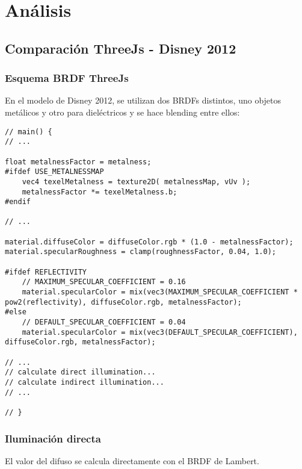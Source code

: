 \chapter{An\'alisis}

\section{Comparaci\'on ThreeJs - Disney 2012}
    \subsection{Esquema BRDF ThreeJs}
        En el modelo de Disney 2012, se utilizan dos BRDFs distintos, uno objetos metálicos y
        otro para dieléctricos y se hace blending entre ellos:
    \singlespacing
    \begin{lstlisting}[caption=My Javascript Example]
// main() {
// ...

float metalnessFactor = metalness;
#ifdef USE_METALNESSMAP
    vec4 texelMetalness = texture2D( metalnessMap, vUv );
    metalnessFactor *= texelMetalness.b;
#endif

// ...

material.diffuseColor = diffuseColor.rgb * (1.0 - metalnessFactor);
material.specularRoughness = clamp(roughnessFactor, 0.04, 1.0);

#ifdef REFLECTIVITY
    // MAXIMUM_SPECULAR_COEFFICIENT = 0.16
    material.specularColor = mix(vec3(MAXIMUM_SPECULAR_COEFFICIENT * pow2(reflectivity), diffuseColor.rgb, metalnessFactor);
#else
    // DEFAULT_SPECULAR_COEFFICIENT = 0.04
    material.specularColor = mix(vec3(DEFAULT_SPECULAR_COEFFICIENT), diffuseColor.rgb, metalnessFactor);

// ...
// calculate direct illumination...
// calculate indirect illumination...
// ...
                                 
// }
    \end{lstlisting}

    \subsection{Iluminaci\'on directa}
        El valor del difuso se calcula directamente con el BRDF de Lambert.

